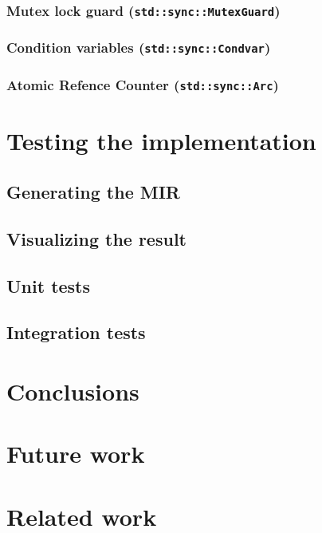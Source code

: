 \documentclass[12pt, oneside]{book}
\begin{document}
\subsection{Mutex lock guard (\texttt{std::sync::MutexGuard})}
\subsection{Condition variables (\texttt{std::sync::Condvar})}
\subsection{Atomic Refence Counter (\texttt{std::sync::Arc})}

\chapter{Testing the implementation}

\section{Generating the MIR}
\section{Visualizing the result}
\section{Unit tests}
\section{Integration tests}
\label{sec:integration-tests}

\cite{dot2015}
\cite{hillah:hal-01176335}
\cite{jungel2000petri}

\chapter{Conclusions}

\chapter{Future work}
\label{chap:future-work}

\chapter{Related work}


\clearpage


\end{document}

